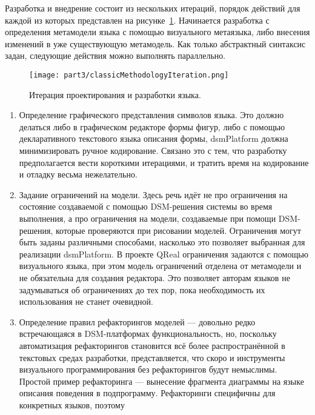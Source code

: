 Разработка и внедрение состоит из нескольких итераций, порядок действий для каждой 
из которых представлен на рисунке~\ref{classicMethodologyIteration}. Начинается разработка 
с определения метамодели языка с помощью визуального метаязыка, либо внесения изменений 
в уже существующую метамодель. Как только абстрактный синтаксис задан, следующие действия 
можно выполнять параллельно.

\begin{figure} [ht]
	\begin{center}
		\texttt{[image: part3/classicMethodologyIteration.png]}
		\caption{Итерация проектирования и разработки языка.}
		\label{classicMethodologyIteration}
	\end{center}
\end{figure}

\begin{enumerate}
	\item Определение графического представления символов языка. Это должно делаться 
		либо в графическом редакторе формы фигур, либо с помощью декларативного текстового
		языка описания формы, \ac{dsmPlatform} должна минимизировать ручное кодирование. 
		Связано это с тем, что разработку предполагается вести короткими итерациями, и 
		тратить время на кодирование и отладку весьма нежелательно.
	\item Задание ограничений на модели. Здесь речь идёт не про ограничения на состояние 
		создаваемой с помощью \ac{DSM}-решения системы во время выполнения, а про ограничения 
		на модели, создаваемые при помощи \ac{DSM}-решения, которые проверяются при рисовании 
		моделей. Ограничения могут быть заданы различными способами, насколько это позволяет
		выбранная для реализации \ac{dsmPlatform}. В проекте QReal ограничения задаются с помощью 
		визуального языка, при этом модель ограничений отделена от метамодели и не обязательна 
		для создания редактора. Это позволяет авторам языков не задумываться об ограничениях 
		до тех пор, пока необходимость их использования не станет очевидной.
	\item Определение правил рефакторингов моделей --- довольно редко встречающаяся в 
		\ac{DSM}-платформах функциональность, но, поскольку автоматизация рефакторингов становится 
		всё более распространённой в текстовых средах разработки, представляется, что 
		скоро и инструменты визуального программирования без рефакторингов будут немыслимы. 
		Простой пример рефакторинга --- вынесение фрагмента диаграммы на языке описания 
		поведения в подпрограмму. Рефакторинги специфичны для конкретных языков, поэтому 

\end{enumerate}
